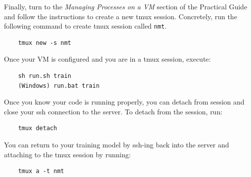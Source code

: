 Finally, turn to the \textit{Managing Processes on a VM} section of the Practical Guide and follow the instructions to create a new tmux session. Concretely, run the following command to create tmux session called \texttt{nmt}. 
\begin{lstlisting}
    tmux new -s nmt
\end{lstlisting}


Once your VM is configured and you are in a tmux session, execute:
\begin{lstlisting}
    sh run.sh train
    (Windows) run.bat train
\end{lstlisting}
    
Once you know your code is running properly, you can detach from session and close your ssh connection to the server. To detach from the session, run:
\begin{lstlisting}
    tmux detach
\end{lstlisting}
    
You can return to your training model by ssh-ing back into the server and attaching to the tmux session by running:
    
\begin{lstlisting}
    tmux a -t nmt
\end{lstlisting}

